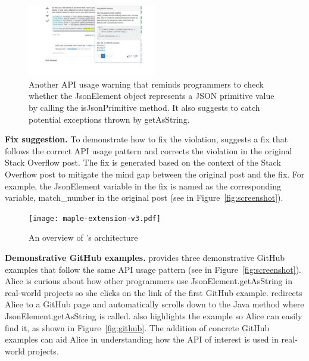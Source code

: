\begin{figure}
\centering
\includegraphics[width=0.5\textwidth]{soap-v3-2.pdf}
  \vspace{.1in}
  \caption{Another API usage warning that reminds programmers to check whether the {\ttt JsonElement} object represents a {\ttt JSON} primitive value by calling the {\ttt isJsonPrimitive} method. It also suggests to catch potential exceptions thrown by {\ttt getAsString}.}
  \label{fig:screenshot2}
\end{figure}

{\bf Fix suggestion.} To demonstrate how to fix the violation, {\tool} suggests a fix that follows the correct API usage pattern and corrects the violation in the original Stack Overflow post. The fix is generated based on the context of the Stack Overflow post to mitigate the mind gap between the original post and the fix. For example, the {\ttt JsonElement} variable in the fix is named as the corresponding variable, {\ttt match\_number} in the original post (see  in Figure~\ref{fig:screenshot}). 

\begin{figure}[!th]
\centering
\texttt{[image: maple-extension-v3.pdf]}
\caption{An overview of {\tool}'s architecture}
\label{fig:arch}
\end{figure}

{\bf Demonstrative GitHub examples.} {\tool} provides three demonstrative GitHub examples that follow the same API usage pattern (see  in Figure~\ref{fig:screenshot}). Alice is curious about how other programmers use {\ttt JsonElement.getAsString} in real-world projects so she clicks on the link of the first GitHub example. {\tool} redirects Alice to a GitHub page and automatically scrolls down to the Java method where {\ttt JsonElement.getAsString} is called. {\tool} also highlights the example so Alice can easily find it, as shown in Figure~\ref{fig:github}. The addition of concrete GitHub examples can aid Alice in understanding how the API of interest is used in real-world projects. 


